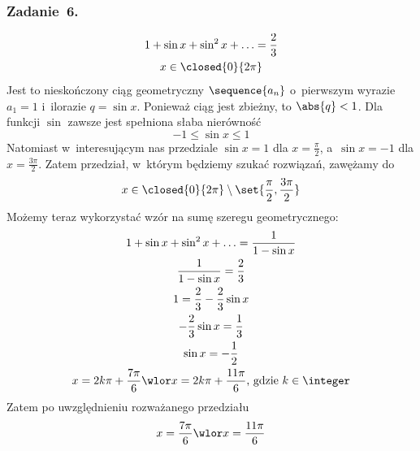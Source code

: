 \subsubsection*{Zadanie~6.}
\begin{gather*}
    1 + \sin x + \sin^2 x + \ldots = \frac{2}{3}\\
    x \in \closed{0}{2\pi}
\end{gather*}
Jest to nieskończony ciąg geometryczny \(\sequence{a_n}\) o~pierwszym wyrazie \(a_1 = 1\) i~ilorazie \(q = \sin x\). Ponieważ ciąg jest zbieżny, to \(\abs{q} < 1\). Dla funkcji \(\sin\) zawsze jest spełniona słaba nierówność
\begin{equation*}
    -1 \leq \sin x \leq 1
\end{equation*}
Natomiast w~interesującym nas przedziale \(\sin x = 1\) dla \(x = \frac{\pi}{2}\), a~\(\sin x = -1\) dla \(x = \frac{3\pi}{2}\). Zatem przedział, w~którym będziemy szukać rozwiązań, zawężamy do
\begin{equation*}
    x \in \closed{0}{2\pi} \setminus \set{\frac{\pi}{2}, \frac{3\pi}{2}}
\end{equation*}
Możemy teraz wykorzystać wzór na sumę szeregu geometrycznego:
\begin{gather*}
    1 + \sin x + \sin^2 x + \ldots = \frac{1}{1 - \sin x}\\
    \frac{1}{1 - \sin x} = \frac{2}{3}\\
    1 = \frac{2}{3} - \frac{2}{3}\sin x\\
    -\frac{2}{3}\sin x = \frac{1}{3}\\
    \sin x = -\frac{1}{2}\\
    x = 2k\pi + \frac{7\pi}{6} \wlor x = 2k\pi + \frac{11\pi}{6} \text{, gdzie } k \in \integer
\end{gather*}
Zatem po uwzględnieniu rozważanego przedziału
\begin{equation*}
    x = \frac{7\pi}{6} \wlor x = \frac{11\pi}{6}
\end{equation*}
